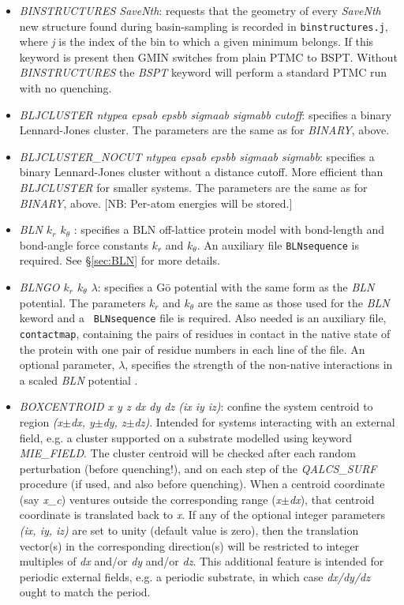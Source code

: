 \documentclass[12pt,a4paper,dvips]{article}
\begin{document}
\begin{itemize}
\item {\it BINSTRUCTURES SaveNth}: requests that the geometry of every {\it SaveNth} 
new structure found during basin-sampling is
recorded in {\tt binstructures.j}, where {\it j} is the index of the bin
to which a given minimum belongs. If this keyword is
present then GMIN switches from plain PTMC to BSPT.  
Without {\it BINSTRUCTURES} the {\it BSPT} keyword will perform a
standard PTMC run with no quenching. 

\item {\it BLJCLUSTER ntypea epsab epsbb sigmaab sigmabb cutoff\/}: specifies a binary Lennard-Jones
cluster. The parameters are the same as for {\it BINARY\/}, above.

\item {\it BLJCLUSTER\_NOCUT ntypea epsab epsbb sigmaab sigmabb\/}: specifies a binary Lennard-Jones
cluster without a distance cutoff. More efficient than {\it BLJCLUSTER\/} for smaller systems.
The parameters are the same as for {\it BINARY\/}, above.
[NB: Per-atom energies will be stored.]

\item {\it BLN $k_r$ $k_\theta$ \/}: specifies a BLN off-lattice protein model with
bond-length and bond-angle force constants $k_r$ and $k_\theta$.
An auxiliary file {\tt BLNsequence} is required.
See \S \ref{sec:BLN} for more details.

\item {\it BLNGO $k_r$ $k_\theta$ $\lambda$}: specifies a G\=o potential
with the same form as the {\it BLN} potential. The parameters $k_r$
and $k_\theta$ are the same as those used for the {\it BLN} keword and a {\tt
BLNsequence} file is required. Also needed is an auxiliary file, {\tt
contactmap}, containing the pairs of residues in contact in the native state of the protein
with one pair of residue numbers in each line of the file. An optional
parameter, $\lambda$, specifies the strength of the non-native interactions in a
scaled {\it BLN} potential \cite{KimKS09}.

\item {\it BOXCENTROID x y z dx dy dz (ix iy iz)}: confine the system centroid to region {\it (x$\pm$dx, y$\pm$dy, z$\pm$dz)}. Intended for systems interacting with an external field, e.g. a cluster supported on a substrate modelled using keyword {\it MIE\_FIELD}. The cluster centroid will be checked after each random perturbation (before quenching!), and on each step of the {\it QALCS\_SURF} procedure (if used, and also before quenching). When a centroid coordinate (say {\it x\_c}) ventures outside the corresponding range ({\it x$\pm$dx}), that centroid coordinate is translated back to {\it x}. If any of the optional integer parameters {\it (ix, iy, iz)} are set to unity (default value is zero), then the translation vector(s) in the corresponding direction(s) will be restricted to integer multiples of {\it dx} and/or {\it dy} and/or {\it dz}. This additional feature is intended for periodic external fields, e.g. a periodic substrate, in which case {\it dx/dy/dz} ought to match the period.


\end{itemize}
\end{document}
